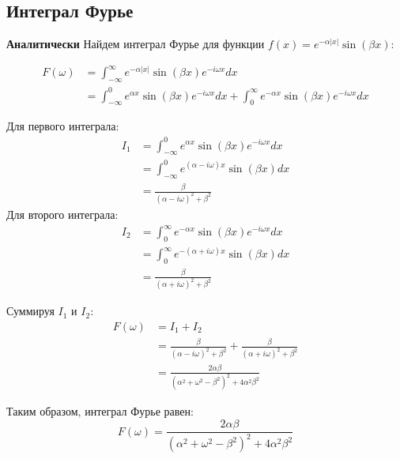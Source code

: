 \subsection{Интеграл Фурье}{
  \textbf{Аналитически}
  Найдем интеграл Фурье для функции $f(x) = e^{-\alpha|x|}\sin(\beta x)$:

  \begin{equation}
  \begin{split}
  F(\omega) &= \int_{-\infty}^{\infty} e^{-\alpha|x|}\sin(\beta x)e^{-i\omega x}dx \\
  &= \int_{-\infty}^{0} e^{\alpha x}\sin(\beta x)e^{-i\omega x}dx + 
     \int_{0}^{\infty} e^{-\alpha x}\sin(\beta x)e^{-i\omega x}dx
  \end{split}
  \end{equation}
  
  Для первого интеграла:
  \begin{equation}
  \begin{split}
  I_1 &= \int_{-\infty}^{0} e^{\alpha x}\sin(\beta x)e^{-i\omega x}dx \\
  &= \int_{-\infty}^{0} e^{(\alpha-i\omega)x}\sin(\beta x)dx \\
  &= \frac{\beta}{(\alpha-i\omega)^2 + \beta^2}
  \end{split}
  \end{equation}
  Для второго интеграла:
  \begin{equation}
  \begin{split}
  I_2 &= \int_{0}^{\infty} e^{-\alpha x}\sin(\beta x)e^{-i\omega x}dx \\
  &= \int_{0}^{\infty} e^{-(\alpha+i\omega)x}\sin(\beta x)dx \\
  &= \frac{\beta}{(\alpha+i\omega)^2 + \beta^2}
  \end{split}
  \end{equation}
  
  Суммируя $I_1$ и $I_2$:
  \begin{equation}
  \begin{split}
  F(\omega) &= I_1 + I_2 \\
  &= \frac{\beta}{(\alpha-i\omega)^2 + \beta^2} + \frac{\beta}{(\alpha+i\omega)^2 + \beta^2} \\
  &= \frac{2\alpha\beta}{(\alpha^2+\omega^2-\beta^2)^2 + 4\alpha^2\beta^2}
  \end{split}
  \end{equation}
  
  Таким образом, интеграл Фурье равен:
  \[
  F(\omega) = \frac{2\alpha\beta}{(\alpha^2+\omega^2-\beta^2)^2 + 4\alpha^2\beta^2}
  \]
  }


